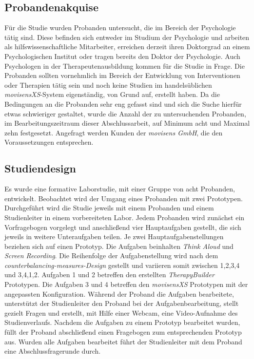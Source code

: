 \subsection{Probandenakquise}
Für die Studie wurden Probanden untersucht, die im Bereich der Psychologie tätig sind. Diese befinden sich entweder im Studium der Psychologie und arbeiten als hilfswissenschaftliche Mitarbeiter, erreichen derzeit ihren Doktorgrad an einem Psychologischen Institut oder tragen bereits den Doktor der Psychologie. Auch Psychologen in der Therapeutenausbildung kommen für die Studie in Frage. Die Probanden sollten vornehmlich im Bereich der Entwicklung von Interventionen oder Therapien tätig sein und noch keine Studien im handelsüblichen \emph{movisensXS}-System eigenständig, von Grund auf, erstellt haben. Da die Bedingungen an die Probanden sehr eng gefasst sind und sich die Suche hierfür etwas schwieriger gestaltet, wurde die Anzahl der zu untersuchenden Probanden, im Bearbeitungszeitraum dieser Abschlussarbeit, auf Minimum acht und Maximal zehn festgesetzt. Angefragt werden Kunden der \emph{movisens GmbH}, die den Voraussetzungen entsprechen. 

\subsection{Studiendesign}
Es wurde eine formative Laborstudie, mit einer Gruppe von acht Probanden, entwickelt. Beobachtet wird der Umgang eines Probanden mit  zwei Prototypen. Durchgeführt wird die Studie jeweils mit einem Probanden und einem Studienleiter in einem vorbereiteten Labor. Jedem Probanden wird zunächst ein Vorfragebogen vorgelegt und anschließend vier Hauptaufgaben gestellt, die sich jeweils in weitere Unteraufgaben teilen. Je zwei Hauptaufgabenstellungen beziehen sich auf einen Prototyp. 
Die Aufgaben beinhalten \emph{Think Aloud} und \emph{Screen Recording}. Die Reihenfolge der Aufgabenstellung wird nach dem \emph{counterbalancing-measures-Design} gestellt und variieren somit zwischen 1,2,3,4 und 3,4,1,2. Aufgaben 1 und 2 betreffen den erstellten \emph{TherapyBuilder} Prototypen. Die Aufgaben 3 und 4 betreffen den \emph{movisensXS} Prototypen mit der angepassten Konfiguration. Während der Proband die Aufgaben bearbeitete, unterstützt der Studienleiter den Proband bei der Aufgabenbearbeitung, stellt gezielt Fragen und erstellt, mit Hilfe einer Webcam, eine Video-Aufnahme des Studienverlaufs. Nachdem die Aufgaben zu einem Prototyp bearbeitet wurden, füllt der Proband abschließend einen Fragebogen zum entsprechenden Prototyp aus. Wurden alle Aufgaben bearbeitet führt der Studienleiter mit dem Proband eine Abschlussfragerunde durch.

